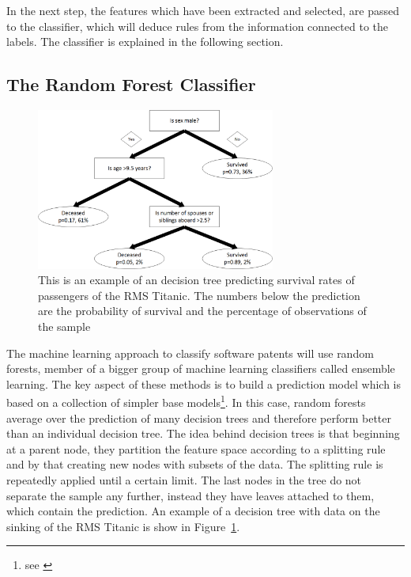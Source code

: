 \documentclass[12pt, a4paper]{scrartcl}
\theoremstyle{definition}
\begin{document}
In the next step, the features which have been extracted and selected, are
passed to the classifier, which will deduce rules from the information
connected to the labels. The classifier is explained in the following section.

\subsection{The Random Forest Classifier} %
\label{sub:the_random_forest_classifier}

\begin{figure}[tb]
	\centering
	\includegraphics[width=0.7\textwidth]{graphics/titanic.png}
    \caption{This is an example of an decision tree predicting survival rates
    of passengers of the RMS Titanic. The numbers below the prediction are the
    probability of survival and the percentage of observations of the sample}
	\label{fig:decisiontree}
\end{figure}

The machine learning approach to classify software patents will use random
forests, member of a bigger group of machine learning classifiers called
ensemble learning. The key aspect of these methods is to build a prediction
model which is based on a collection of simpler base models\footnote{see
\citet[Chapter 16]{friedman2009elements}}. In this case, random forests average
over the prediction of many decision trees and therefore perform better than an
individual decision tree. The idea behind decision trees is that beginning at a
parent node, they partition the feature space according to a splitting rule and
by that creating new nodes with subsets of the data. The splitting rule is
repeatedly applied until a certain limit. The last nodes in the tree do not
separate the sample any further, instead they have leaves attached to them,
which contain the prediction. An example of a decision tree with data on the
sinking of the RMS Titanic is show in Figure~\ref{fig:decisiontree}.
\end{document}
